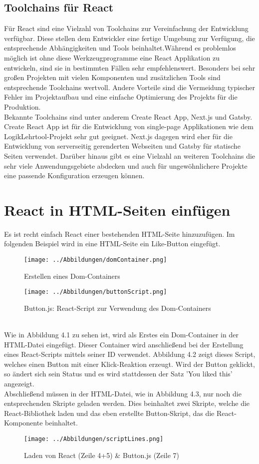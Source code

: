\subsection{Toolchains für React}
Für React sind eine Vielzahl von Toolchains zur Vereinfachung der Entwicklung verfügbar. Diese stellen dem Entwickler eine fertige Umgebung zur Verfügung, die entsprechende Abhängigkeiten und Tools beinhaltet.Während es problemlos möglich ist ohne diese Werkzeugprogramme eine React Applikation zu entwickeln, sind sie in bestimmten Fällen sehr empfehlenswert. Besonders bei sehr großen Projekten mit vielen Komponenten und zusätzlichen Tools sind entsprechende Toolchains wertvoll. Andere Vorteile sind die Vermeidung typischer Fehler im Projektaufbau und eine einfache Optimierung des Projekts für die Produktion.\\
Bekannte Toolchains sind unter anderem Create React App, Next.js und Gatsby. Create React App ist für die Entwicklung von single-page Applikationen wie dem LogikLehrtool-Projekt sehr gut geeignet. Next.js dagegen wird eher für die Entwicklung von serverseitig gerenderten Webseiten und Gatsby für statische Seiten verwendet. Darüber hinaus gibt es eine Vielzahl an weiteren Toolchains die sehr viele Anwendungsgebiete abdecken und auch für ungewöhnlichere Projekte eine passende Konfiguration erzeugen können.
\pagebreak
\section{React in HTML-Seiten einfügen}
Es ist recht einfach React einer bestehenden HTML-Seite hinzuzufügen. Im folgenden Beispiel wird in eine HTML-Seite ein Like-Button eingefügt.\\
\begin{figure}[thb]
     \centerline{\texttt{[image: ../Abbildungen/domContainer.png]}}
  \caption{Erstellen eines Dom-Containers}
  \label{fig1_1}
  \vspace{1cm}
     \centerline{\texttt{[image: ../Abbildungen/buttonScript.png]}}
  \caption{Button.js: React-Script zur Verwendung des Dom-Containers}
  \label{fig1_1}
\end{figure}\\
Wie in Abbildung 4.1 zu sehen ist, wird als Erstes ein Dom-Container in der HTML-Datei eingefügt. Dieser Container wird anschließend bei der Erstellung eines React-Scripts mittels seiner ID verwendet. Abbildung 4.2 zeigt dieses Script, welches einen Button mit einer Klick-Reaktion erzeugt. Wird der Button geklickt, so ändert sich sein Status und es wird stattdessen der Satz 'You liked this' angezeigt. \\
Abschließend müssen in der HTML-Datei, wie in Abbildung 4.3, nur noch die entsprechenden Skripte geladen werden. Dies beinhaltet zwei Skripte, welche die React-Bibliothek laden und das eben erstellte Button-Skript, das die React-Komponente beinhaltet.
\begin{figure}[thb]
     \centerline{\texttt{[image: ../Abbildungen/scriptLines.png]}}
  \caption{Laden von React (Zeile 4+5) \& Button.js (Zeile 7)}
  \label{fig1_1}
\end{figure}\\

